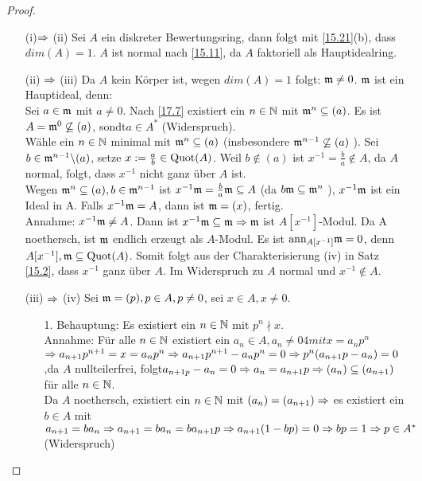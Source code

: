 \begin{proof}
	\begin{enumerate}
		\item[] (i)$\Rightarrow$ (ii) Sei $A$ ein diskreter Bewertungsring, dann folgt mit \ref{15.21}(b), dass $dim(A)=1$. $A$ ist normal nach \ref{15.11}, da $A$ faktoriell als Hauptidealring.
		\item[](ii) $\Rightarrow $ (iii) Da $A$ kein Körper ist, wegen $dim(A)=1 $ folgt: $\mathfrak{m} \neq 0$. $\mathfrak{m} $ ist ein Hauptideal, denn: \\
		Sei $a \in \mathfrak{m} $ mit $a \neq 0$. Nach \ref{17.7} existiert ein $n \in \mathbb{N} $ mit $\mathfrak{m}^n \subseteq (a) $. Es ist $A=\mathfrak{m}^0 \not\subseteq (a) $, sondt$ a\in A^{*}$ (Widerspruch). \\
		Wähle ein $n \in \mathbb{N} $ minimal mit $\mathfrak{m}^n \subseteq (a) $ (insbesondere $\mathfrak{m}^{n-1} \not \subseteq (a)$ ). Sei $b \in \mathfrak{m}^{n-1} \backslash (a)$, setze $x := \frac{a}{b} \in \operatorname{Quot}(A) $. Weil $b \notin (a) $ ist $x^{-1} = \frac{b}{a} \notin A$, da $A$ normal, folgt, dass $x^{-1} $ nicht ganz über $A$ ist. \\
		Wegen $\mathfrak{m}^n \subseteq (a), b \in \mathfrak{m}^{n-1} $ ist $x^{-1}\mathfrak{m} = \frac{b}{a}\mathfrak{m} \subseteq A$ (da $b\mathfrak{m} \subseteq \mathfrak{m}^n$ ), $x^{-1}\mathfrak{m} $ ist ein Ideal in A. Falls $x^{-1}\mathfrak{m} = A$, dann ist $\mathfrak{m} = (x) $, fertig. \\
		Annahme: $x^{-1}\mathfrak{m} \neq A$. Dann ist $x^{-1}\mathfrak{m} \subseteq \mathfrak{m} \Rightarrow \mathfrak{m}$ ist $ A[x^{-1}]$-Modul. Da A noethersch, ist $\mathfrak{m} $ endlich erzeugt als $A$-Modul. Es ist $\text{ann}_{A[x^{-1}]}\mathfrak{m} = 0$,  denn $A[x^{-1}],\mathfrak{m} \subseteq \operatorname{Quot}(A)$. Somit folgt aus der Charakterisierung (iv) in Satz \ref{15.2}, dass $x^{-1} $ ganz über $A$. Im Widerspruch zu $A$ normal und $x^{-1} \notin A $. 
		\item[] (iii) $\Rightarrow $ (iv) Sei $\mathfrak{m} = (p) , p \in A, p \neq 0$, sei $x\in A, x\neq 0$.
		\begin{enumerate} 
			\item[1.] Behauptung: Es existiert ein $n \in \mathbb{N} $ mit $p^n \nmid x. $ \\
			Annahme: Für alle $ n \in \mathbb{N} $ existiert ein $a_n \in A, a_n \neq 04 mit x = a_np^n$\\
			$\Rightarrow a_{n+1}p^{n+1} = x =a_np^n \Rightarrow a_{n+1}p^{n+1} -a_np^n = 0 \Rightarrow p^n(a_{n+1}p-a_n) = 0 $,da $A$ nullteilerfrei, folgt$ a_{n+1p}-a_n = 0 \Rightarrow a_n = a_{n+1} p \Rightarrow (a_n) \subseteq (a_{n+1}) $ für alle $n \in \mathbb{N}$.\\
			Da $A$ noethersch, existiert ein $n\in \mathbb{N} $ mit $(a_n) = (a_{n+1}) \Rightarrow$ es existiert ein$ b \in A $ mit $ a_{n+1} = ba_n \Rightarrow a_{n+1} =ba_n = ba_{n+1}p \Rightarrow a_{n+1}(1-bp) = 0 \Rightarrow bp = 1 \Rightarrow p \in A^{*} $(Widerspruch)

\end{enumerate}
\end{enumerate}
\end{proof}
